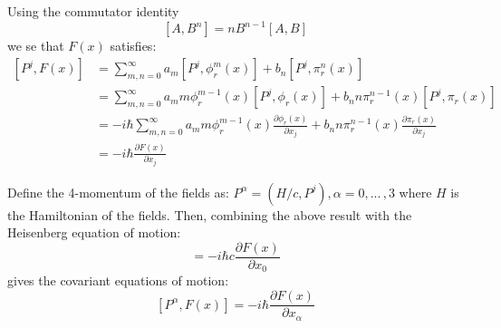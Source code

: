 \documentclass[letterpaper,12pt]{article}
\newenvironment{problem}{\subsection{}\begin{adjustwidth}{0.25in}{}\vspace{-\baselineskip}}{\end{adjustwidth}}
\newcommand{\pder}[2]{\frac{\partial #1}{\partial #2}}
\begin{document}
\begin{problem}
Using the commutator identity
\begin{equation*}
	\left[A, B^n\right] = nB^{n-1}\left[A,B\right]
\end{equation*}
we se that $F(x)$ satisfies:
\begin{align*}
	\left[P^j, F(x)\right] &= \sum_{m,n=0}^{\infty} a_m\left[P^j, \phi^m_r(x)\right] + b_n\left[P^j, \pi^n_r(x)\right]	\\
	&= \sum_{m,n=0}^{\infty} a_m m\phi^{m-1}_r(x) \left[P^j, \phi_r(x)\right] + b_n n\pi^{n-1}_r(x) \left[P^j, \pi_r(x)\right]		\\
	&= -i\hbar\sum_{m,n=0}^{\infty} a_m m\phi^{m-1}_r(x)\pder{\phi_r(x)}{x_j} + b_n n\pi^{n-1}_r(x)\pder{\pi_r(x)}{x_j}	\\
	&= -i\hbar \pder{F(x)}{x_j}		 
\end{align*}

Define the 4-momentum of the fields as: $P^\alpha = (H/c, P^j), \alpha = 0, ... \,, 3$ where $H$ is the Hamiltonian of the fields. Then, combining the above result with the Heisenberg equation of motion:
\begin{equation*}
	[H, F(x)] = -i\hbar c \pder{F(x)}{x_0}
\end{equation*}
gives the covariant equations of motion:
\begin{equation*}
	\left[P^\alpha, F(x)\right] = -i\hbar \pder{F(x)}{x_\alpha}			 
\end{equation*}
\end{problem}
\end{document}
